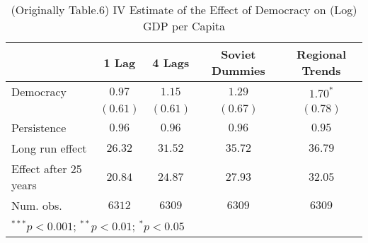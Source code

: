
\begin{table}
\begin{center}
\begin{tabular}{l c c c c}
\hline
 & 1 Lag & 4 Lags & Soviet Dummies & Regional Trends \\
\hline
Democracy             & $0.97$   & $1.15$   & $1.29$   & $1.70^{*}$ \\
                      & $(0.61)$ & $(0.61)$ & $(0.67)$ & $(0.78)$   \\
\hline
Persistence           & $0.96$   & $0.96$   & $0.96$   & $0.95$     \\
Long run effect       & $26.32$  & $31.52$  & $35.72$  & $36.79$    \\
Effect after 25 years & $20.84$  & $24.87$  & $27.93$  & $32.05$    \\
Num. obs.             & $6312$   & $6309$   & $6309$   & $6309$     \\
\hline
\multicolumn{5}{l}{\scriptsize{$^{***}p<0.001$; $^{**}p<0.01$; $^{*}p<0.05$}}
\end{tabular}
\caption{(Originally Table.6) IV Estimate of the Effect of Democracy on (Log) GDP per Capita}
\label{table:coefficients}
\end{center}
\end{table}
